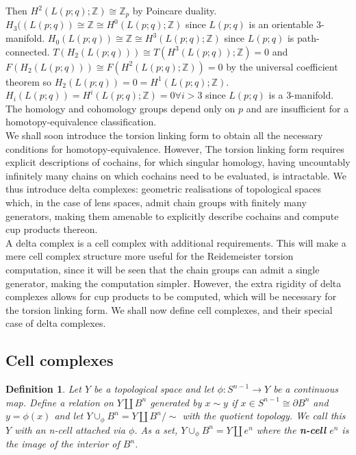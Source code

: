 \documentclass{article}
\newtheorem{definition}[theorem]{Definition}
\begin{document}
\noindent Then $H^2(L(p;q);\mathbb{Z})\cong\mathbb{Z}_p$ by Poincare duality. $H_3((L(p;q))\cong\mathbb{Z}\cong H^0(L(p;q);\mathbb{Z})$ since $L(p;q)$ is an orientable 3-manifold. $H_0(L(p;q))\cong\mathbb{Z}\cong H^3(L(p;q);\mathbb{Z})$ since $L(p;q)$ is path-connected. $T(H_2(L(p;q)))\cong T(H^3(L(p;q));\mathbb{Z})=0$ and $F(H_2(L(p;q)))\cong F(H^2(L(p;q);\mathbb{Z}))=0$ by the universal coefficient theorem so $H_2(L(p;q))=0=H^1(L(p;q);\mathbb{Z})$. $H_i(L(p;q))=H^i(L(p;q);\mathbb{Z})=0\forall i>3$ since $L(p;q)$ is a 3-manifold. The homology and cohomology groups depend only on $p$ and are insufficient for a homotopy-equivalence classification.\\

\noindent We shall soon introduce the torsion linking form to obtain all the necessary conditions for homotopy-equivalence. However, The torsion linking form requires explicit descriptions of cochains, for which singular homology, having uncountably infinitely many chains on which cochains need to be evaluated, is intractable. We thus introduce delta complexes: geometric realisations of topological spaces which, in the case of lens spaces, admit chain groups with finitely many generators, making them amenable to explicitly describe cochains and compute cup products thereon.\\

\noindent A delta complex is a cell complex with additional requirements. This will make a mere cell complex structure more useful for the Reidemeister torsion computation, since it will be seen that the chain groups can admit a single generator, making the computation simpler. However, the extra rigidity of delta complexes allows for cup products to be computed, which will be necessary for the torsion linking form. We shall now define cell complexes, and their special case of delta complexes.

\subsection{Cell complexes}
\begin{definition}
Let $Y$ be a topological space and let $\phi\colon S^{n-1}\to Y$ be a continuous map. Define a relation on $Y\coprod B^n$ generated by $x\sim y$ if $x\in S^{n-1}\cong\partial B^n$ and $y=\phi(x)$ and let $Y\cup_\phi B^n=Y\coprod B^n/\sim$ with the quotient topology. We call this $Y$ with an n-cell attached via $\phi$.
\noindent As a set, $Y\cup_\phi B^n=Y\coprod e^n$ where the \textbf{n-cell} $e^n$ is the image of the interior of $B^n$.
\end{definition}
\end{document}
